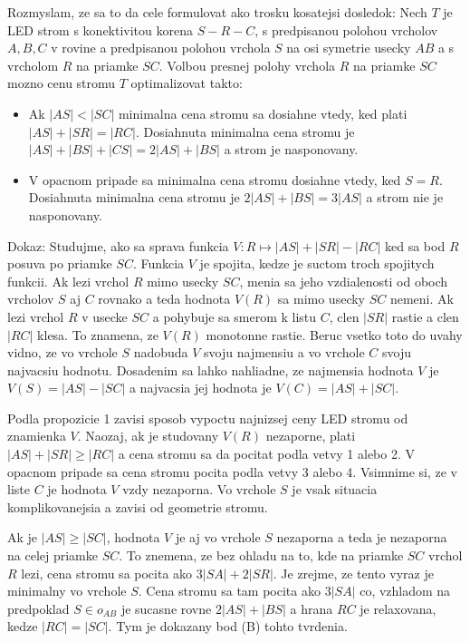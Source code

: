 \documentclass[12pt]{book}
\begin{document}
Rozmyslam, ze sa to da cele formulovat ako trosku kosatejsi dosledok:
Nech $T$ je LED strom s konektivitou korena $S-R-C$, s predpisanou polohou
    vrcholov $A,B,C$ v rovine a predpisanou polohou vrchola $S$ na osi symetrie
    usecky $AB$ a s vrcholom $R$ na priamke $SC$.
Volbou presnej polohy vrchola $R$ na priamke $SC$ mozno cenu stromu $T$
    optimalizovat takto:
    \begin{itemize}
        \item[(A)] Ak $|AS|<|SC|$ minimalna cena stromu sa dosiahne vtedy,
                ked plati $|AS|+|SR|=|RC|$.
            Dosiahnuta minimalna cena stromu je $|AS|+|BS|+|CS|=2|AS|+|BS|$ a
                strom je nasponovany.
        \item[(B)] V opacnom pripade sa minimalna cena stromu dosiahne vtedy,
                ked $S=R$.
            Dosiahnuta minimalna cena stromu je $2|AS|+|BS|=3|AS|$ a strom
                nie je nasponovany.
    \end{itemize}

Dokaz:
Studujme, ako sa sprava funkcia $V\colon R\mapsto|AS|+|SR|-|RC|$ ked sa bod
    $R$ posuva po priamke $SC$.
Funkcia $V$ je spojita, kedze je suctom troch spojitych funkcii.
Ak lezi vrchol $R$ mimo usecky $SC$, menia sa jeho vzdialenosti od oboch
    vrcholov $S$ aj $C$ rovnako a teda hodnota $V(R)$ sa mimo usecky $SC$
    nemeni.
Ak lezi vrchol $R$ v usecke $SC$ a pohybuje sa smerom k listu $C$, clen $|SR|$
    rastie a clen $|RC|$ klesa.
To znamena, ze $V(R)$ monotonne rastie.
Beruc vsetko toto do uvahy vidno, ze vo vrchole $S$ nadobuda $V$ svoju
    najmensiu a vo vrchole $C$ svoju najvacsiu hodnotu.
Dosadenim sa lahko nahliadne, ze najmensia hodnota $V$ je $V(S)=|AS|-|SC|$ a
    najvacsia jej hodnota je $V(C)=|AS|+|SC|$.

Podla propozicie 1 zavisi sposob vypoctu najnizsej ceny LED stromu od znamienka
    $V$.
Naozaj, ak je studovany $V(R)$ nezaporne, plati $|AS|+|SR|\ge|RC|$ a cena
    stromu sa da pocitat podla vetvy 1 alebo 2.
V opacnom pripade sa cena stromu pocita podla vetvy 3 alebo 4.
Vsimnime si, ze v liste $C$ je hodnota $V$ vzdy nezaporna.
Vo vrchole $S$ je vsak situacia komplikovanejsia a zavisi od geometrie stromu.

Ak je $|AS|\ge|SC|$, hodnota $V$ je aj vo vrchole $S$ nezaporna a teda je
    nezaporna na celej priamke $SC$.
To znemena, ze bez ohladu na to, kde na priamke $SC$ vrchol $R$ lezi, cena
    stromu sa pocita ako $3|SA|+2|SR|$.
Je zrejme, ze tento vyraz je minimalny vo vrchole $S$.
Cena stromu sa tam pocita ako $3|SA|$ co, vzhladom na predpoklad $S\in o_{AB}$
    je sucasne rovne $2|AS|+|BS|$ a hrana $RC$ je relaxovana, kedze
    $|RC|=|SC|$.
Tym je dokazany bod (B) tohto tvrdenia.
\end{document}
